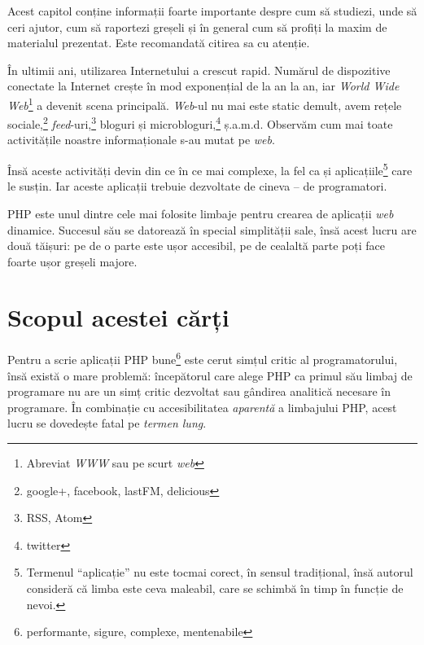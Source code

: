 
\begin{chapsummary}

Acest capitol conține informații foarte importante despre cum să studiezi, unde
să ceri ajutor, cum să raportezi greșeli și în general cum să profiți la maxim
de materialul prezentat. Este recomandată citirea sa cu atenție.

\end{chapsummary}

În ultimii ani, utilizarea Internetului a crescut rapid. Numărul de dispozitive
conectate la Internet crește în mod exponențial de la an la an, iar
\textsl{World Wide Web}\footnote{Abreviat
    \textsl{WWW} sau pe scurt
    \textsl{web}}
a devenit scena principală. \textit{Web}-ul nu mai este static demult, avem
rețele sociale,\footnote{google+, facebook, lastFM, delicious}
\textsl{feed}-uri,\footnote{RSS,%
Atom}
bloguri și microbloguri,\footnote{twitter} ș.a.m.d. Observăm cum mai
toate activitățile noastre informaționale s-au mutat pe \textit{web}.

Însă aceste activități devin din ce în ce mai complexe, la fel ca și
aplicațiile\footnote{Termenul ``aplicație'' nu este tocmai corect, în sensul
tradițional, însă autorul consideră că limba este ceva maleabil, care se
schimbă în timp în funcție de nevoi.} care le susțin.  Iar aceste aplicații
trebuie dezvoltate de cineva -- de programatori.

PHP este unul dintre cele mai folosite limbaje pentru crearea de aplicații
\textit{web} dinamice. Succesul său se datorează în special simplității sale,
însă acest lucru are două tăișuri: pe de o parte este ușor accesibil, pe de
cealaltă parte poți face foarte ușor greșeli majore.

\section*{Scopul acestei cărți}
{}

Pentru a scrie aplicații PHP bune\footnote{performante, sigure, complexe,
mentenabile} este cerut simțul critic al programatorului, însă există o mare
problemă: începătorul care alege PHP ca primul său limbaj de programare nu are
un simț critic dezvoltat sau gândirea analitică necesare în programare. În
combinație cu accesibilitatea \textit{aparentă} a limbajului PHP, acest lucru
se dovedește fatal pe \textit{termen lung}.

